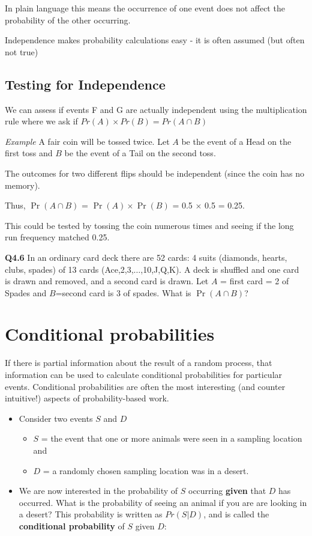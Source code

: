 \documentclass[
  oneside]{krantz}
\providecommand{\tightlist}{%
  \setlength{\itemsep}{0pt}\setlength{\parskip}{0pt}}
\begin{document}
In plain language this means the occurrence of one event does not affect the probability of the other occurring.

Independence makes probability calculations easy - it is often assumed (but often not true)

\hypertarget{testing-for-independence}{%
\subsection{Testing for Independence}\label{testing-for-independence}}

We can assess if events F and G are actually independent using the multiplication rule where we ask if \(Pr(A) \times Pr(B)=Pr(A \cap B)\)

\emph{Example} A fair coin will be tossed twice. Let \(A\) be the event of
a Head on the first toss and \(B\) be the event of a Tail on the second toss.

The outcomes for two different flips should be independent (since the coin has no memory).

Thus, \(\Pr(A \cap B)\) = \(\Pr(A) \times \Pr(B)\) = 0.5 \(\times\) 0.5 = 0.25.

This could be tested by tossing the coin numerous times and seeing if the long run frequency matched 0.25.

\textbf{Q4.6} In an ordinary card deck there are 52 cards: 4 suits (diamonds, hearts,
clubs, spades) of 13 cards (Ace,2,3,\(\ldots\),10,J,Q,K). A deck is shuffled
and one card is drawn and removed, and a second card is drawn. Let \(A\) = first
card = 2 of Spades and \(B\)=second card is 3 of spades. What is \(\Pr(A \cap B)\)?

\hypertarget{conditional-probabilities}{%
\section{Conditional probabilities}\label{conditional-probabilities}}

If there is partial information about the result of a random process, that
information can be used to calculate conditional probabilities for particular events. Conditional probabilities are often the most interesting (and counter intuitive!) aspects of probability-based work.

\begin{itemize}
\item
  Consider two events \(S\) and \(D\)

  \begin{itemize}
  \tightlist
  \item
    \(S\) = the event that one or more animals were seen in a sampling location and
  \item
    \(D\) = a randomly chosen sampling location was in a desert.
  \end{itemize}
\item
  We are now interested in the probability of \(S\) occurring \textbf{given} that \(D\) has occurred. What is the probability of seeing an animal if you are are looking in a desert? This probability is written as \(Pr (S|D)\), and is called the \textbf{conditional probability} of \(S\) given \(D\):
\end{itemize}
\end{document}
